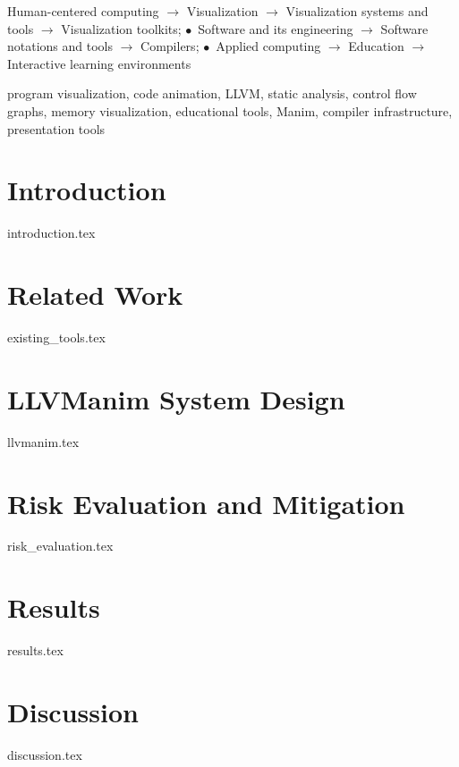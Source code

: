 \documentclass[conference]{IEEEtran}
\begin{document}
\begin{IEEEconcepts}
Human-centered computing $\rightarrow$ Visualization $\rightarrow$ Visualization systems and tools $\rightarrow$ Visualization toolkits;
$\bullet$~Software and its engineering $\rightarrow$ Software notations and tools $\rightarrow$ Compilers;
$\bullet$~Applied computing $\rightarrow$ Education $\rightarrow$ Interactive learning environments
\end{IEEEconcepts}

\begin{IEEEkeywords}
program visualization, code animation, LLVM, static analysis, control flow graphs, memory visualization, educational tools, Manim, compiler infrastructure, presentation tools
\end{IEEEkeywords}

\section{Introduction}
\label{sec:introduction}
{introduction.tex}

\section{Related Work}
\label{sec:related_work}
{existing_tools.tex}

\section{LLVManim System Design}
\label{sec:llvmanim}
{llvmanim.tex}

\section{Risk Evaluation and Mitigation}
\label{sec:risk_evaluation}
{risk_evaluation.tex}

\section{Results}
\label{sec:results}
{results.tex}

\section{Discussion}
\label{sec:discussion}
{discussion.tex}
\end{document}
